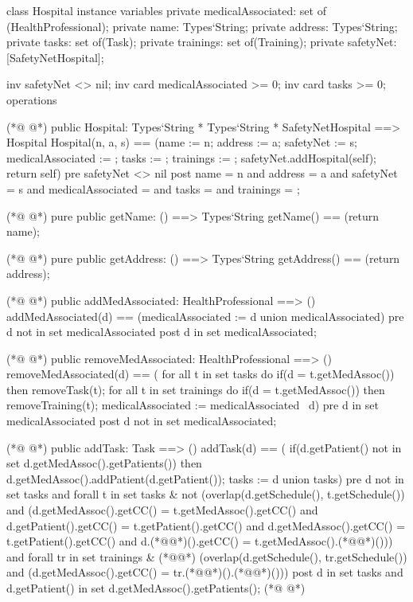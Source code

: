 \begin{vdmpp}[breaklines=true]
class Hospital
instance variables
  private medicalAssociated: set of (HealthProfessional);
  private name: Types`String;
  private address: Types`String;
  private tasks: set of(Task);
  private trainings: set of(Training);
  private safetyNet: [SafetyNetHospital];
 
 inv safetyNet <> nil; 
 inv card medicalAssociated >= 0;
 inv card tasks >= 0;
operations

(*@
\label{Hospital:15}
@*)
 public Hospital: Types`String * Types`String * SafetyNetHospital ==> Hospital
  Hospital(n, a, s) == (name := n; address := a; safetyNet := s; medicalAssociated := {}; tasks := {}; trainings := {}; 
  safetyNet.addHospital(self); return self)
 pre safetyNet <> nil
 post name = n and address = a and safetyNet = s and medicalAssociated = {} and tasks = {} and trainings = {};
 
(*@
\label{getName:21}
@*)
 pure public getName: () ==> Types`String
  getName() == (return name);
 
(*@
\label{getAddress:24}
@*)
 pure public getAddress: () ==> Types`String
  getAddress() == (return address);
 
(*@
\label{addMedAssociated:27}
@*)
 public addMedAssociated: HealthProfessional ==> ()
  addMedAssociated(d) == (medicalAssociated := {d} union medicalAssociated)
 pre d not in set medicalAssociated
 post d in set medicalAssociated;
  
(*@
\label{removeMedAssociated:32}
@*)
 public removeMedAssociated: HealthProfessional ==> ()
  removeMedAssociated(d) == (
                for all t in set tasks do
                 if(d = t.getMedAssoc())
                  then removeTask(t);
                for all t in set trainings do
                 if(d = t.getMedAssoc())
                  then removeTraining(t);
                medicalAssociated := medicalAssociated \ {d})
 pre d in set medicalAssociated
 post d not in set medicalAssociated;
 
(*@
\label{addTask:44}
@*)
 public addTask: Task ==> ()
  addTask(d) == (
          if(d.getPatient() not in set d.getMedAssoc().getPatients())
           then d.getMedAssoc().addPatient(d.getPatient());
          tasks := {d} union tasks)
 pre d not in set tasks and forall t in set tasks & 
  not (overlap(d.getSchedule(), t.getSchedule()) and (d.getMedAssoc().getCC() = t.getMedAssoc().getCC() 
  and d.getPatient().getCC() = t.getPatient().getCC() and d.getMedAssoc().getCC() = t.getPatient().getCC() and d.(*@@*)().getCC() = t.getMedAssoc().(*@@*)()))
  and forall tr in set trainings & (*@@*) (overlap(d.getSchedule(), tr.getSchedule()) and (d.getMedAssoc().getCC() = tr.(*@@*)().(*@@*)()))
 post d in set tasks and d.getPatient() in set d.getMedAssoc().getPatients();
(*@
\label{removeTask:54}
@*)
  

\end{vdmpp}
